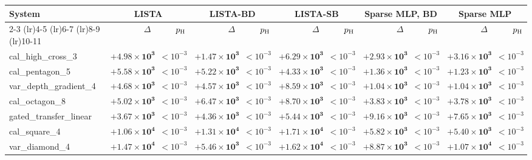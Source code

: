 \begin{tabular}{@{}l rr rr rr rr rr@{}}
\toprule
System & \multicolumn{2}{c}{LISTA} & \multicolumn{2}{c}{LISTA-BD} & \multicolumn{2}{c}{LISTA-SB} & \multicolumn{2}{c}{Sparse MLP, BD} & \multicolumn{2}{c}{Sparse MLP} \\
\cmidrule(lr){2-3} \cmidrule(lr){4-5} \cmidrule(lr){6-7} \cmidrule(lr){8-9} \cmidrule(lr){10-11}
 & $\Delta$ & $p_{\rm H}$ & $\Delta$ & $p_{\rm H}$ & $\Delta$ & $p_{\rm H}$ & $\Delta$ & $p_{\rm H}$ & $\Delta$ & $p_{\rm H}$ \\
\midrule
cal\_high\_cross\_3 & $\mathbf{+4.98{\times}10^{3}}$ & $<\!10^{-3}$ & $\mathbf{+1.47{\times}10^{3}}$ & $<\!10^{-3}$ & $\mathbf{+6.29{\times}10^{3}}$ & $<\!10^{-3}$ & $\mathbf{+2.93{\times}10^{3}}$ & $<\!10^{-3}$ & $\mathbf{+3.16{\times}10^{3}}$ & $<\!10^{-3}$ \\
cal\_pentagon\_5 & $\mathbf{+5.58{\times}10^{3}}$ & $<\!10^{-3}$ & $\mathbf{+5.22{\times}10^{3}}$ & $<\!10^{-3}$ & $\mathbf{+4.33{\times}10^{3}}$ & $<\!10^{-3}$ & $\mathbf{+1.36{\times}10^{3}}$ & $<\!10^{-3}$ & $\mathbf{+1.23{\times}10^{3}}$ & $<\!10^{-3}$ \\
var\_depth\_gradient\_4 & $\mathbf{+4.68{\times}10^{3}}$ & $<\!10^{-3}$ & $\mathbf{+4.57{\times}10^{3}}$ & $<\!10^{-3}$ & $\mathbf{+8.59{\times}10^{3}}$ & $<\!10^{-3}$ & $\mathbf{+1.04{\times}10^{3}}$ & $<\!10^{-3}$ & $\mathbf{+1.04{\times}10^{3}}$ & $<\!10^{-3}$ \\
cal\_octagon\_8 & $\mathbf{+5.02{\times}10^{3}}$ & $<\!10^{-3}$ & $\mathbf{+6.47{\times}10^{3}}$ & $<\!10^{-3}$ & $\mathbf{+8.70{\times}10^{3}}$ & $<\!10^{-3}$ & $\mathbf{+3.83{\times}10^{3}}$ & $<\!10^{-3}$ & $\mathbf{+3.78{\times}10^{3}}$ & $<\!10^{-3}$ \\
gated\_transfer\_linear & $\mathbf{+3.67{\times}10^{3}}$ & $<\!10^{-3}$ & $\mathbf{+4.36{\times}10^{3}}$ & $<\!10^{-3}$ & $\mathbf{+5.44{\times}10^{3}}$ & $<\!10^{-3}$ & $\mathbf{+9.16{\times}10^{3}}$ & $<\!10^{-3}$ & $\mathbf{+7.65{\times}10^{3}}$ & $<\!10^{-3}$ \\
cal\_square\_4 & $\mathbf{+1.06{\times}10^{4}}$ & $<\!10^{-3}$ & $\mathbf{+1.31{\times}10^{4}}$ & $<\!10^{-3}$ & $\mathbf{+1.71{\times}10^{4}}$ & $<\!10^{-3}$ & $\mathbf{+5.82{\times}10^{3}}$ & $<\!10^{-3}$ & $\mathbf{+5.40{\times}10^{3}}$ & $<\!10^{-3}$ \\
var\_diamond\_4 & $\mathbf{+1.47{\times}10^{4}}$ & $<\!10^{-3}$ & $\mathbf{+5.46{\times}10^{3}}$ & $<\!10^{-3}$ & $\mathbf{+1.62{\times}10^{4}}$ & $<\!10^{-3}$ & $\mathbf{+8.87{\times}10^{3}}$ & $<\!10^{-3}$ & $\mathbf{+1.07{\times}10^{4}}$ & $<\!10^{-3}$ \\

\end{tabular}
